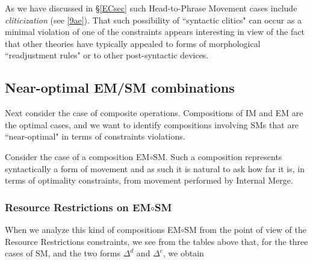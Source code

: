\documentclass[12pt]{amsart}
\numberwithin{equation}{section}
\begin{document}
As we have discussed in \S \ref{ECsec} such Head-to-Phrase Movement
cases include {\em cliticization} (see \eqref{9ae}).
That such possibility of ``syntactic clitics" can occur as a minimal violation
of one of the constraints appears interesting in view of the fact that
other theories have typically appealed to forms of 
morphological ``readjustment rules" or to other post-syntactic 
devices.

\smallskip
\subsection{Near-optimal EM/SM combinations} \label{EMSMnearIM}

Next consider the case of composite operations. Compositions
of IM and EM are the optimal cases, and we want to identify
compositions involving SMs that are ``near-optimal" in terms
of constraints violations.

Consider the case of a composition EM$\circ$SM. 
Such a composition represents syntactically a form
of movement and as such it is natural to ask how far
it is, in terms of optimality constraints, from 
movement performed by Internal Merge.

\subsubsection{Resource Restrictions on EM$\circ$SM}
When we analyze this kind of compositions EM$\circ$SM 
from the point of view of the Resource Restrictions constraints,
we see from the tables above that, for the three cases of SM,
and the two forms $\Delta^d$ and $\Delta^c$, we obtain
\end{document}
